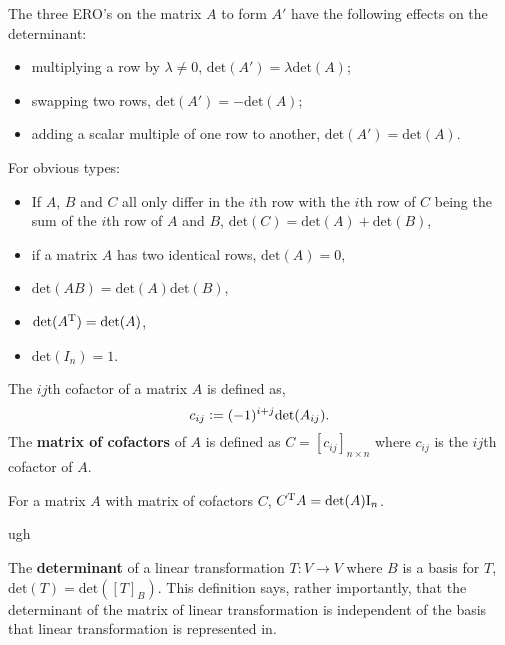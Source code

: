 \documentclass[../Year1.tex]{subfiles}
\begin{document}
\begin{definition}[EROs]
    The three ERO's on the matrix $A$ to form $A'$ have the following effects on the determinant: \begin{itemize}
        \item multiplying a row by $\lambda\neq0$, $\text{det}(A') = \lambda\text{det}(A)$;
        \item swapping two rows, $\text{det}(A') = -\text{det}(A)$;
        \item adding a scalar multiple of one row to another, $\text{det}(A') = \text{det}(A)$.
    \end{itemize}
\end{definition}

\begin{definition} For obvious types:
\begin{itemize}
    \item If $A$, $B$ and $C$ all only differ in the $i$th row with the $i$th row of $C$ being the sum of the $i$th row of $A$ and $B$, $\text{det}(C) = \text{det}(A) + \text{det}(B)$,
    \item if a matrix $A$ has two identical rows, $\text{det}(A)=0$,
    \item $\text{det}(AB)=\text{det}(A)\text{det}(B)$,
    \item $\text{det}(A^{\mathrm{T}}) = \text{det}(A)$,
    \item $\text{det}(I_n)=1$.
\end{itemize}
\end{definition}

\begin{definition}[Cofactor]
    The $ij$th cofactor of a matrix $A$ is defined as, \[
        c_{ij} := (-1)^{i+j}\text{det}(A_{ij})
        \textcolor{black}{.}
    \]
    The \textbf{matrix of cofactors} of $A$ is defined as $C=[c_{ij}]_{n\times n}$ where $c_{ij}$ is the $ij$th cofactor of $A$.
\end{definition}

\begin{theorem}
    For a matrix $A$ with matrix of cofactors $C$, $C^{\mathrm{T}} A = \text{det}(A)\mathrm{I}_n$.
\end{theorem}

\begin{theorem}
    ugh
\end{theorem}

\begin{definition}
    The \textbf{determinant} of a linear transformation $T:V\rightarrow V$ where $B$ is a basis for $T$, $\text{det}(T) = \text{det}([T]_B)$. This definition says, rather importantly, that the determinant of the matrix of linear transformation is independent of the basis that linear transformation is represented in.
\end{definition}
\end{document}
